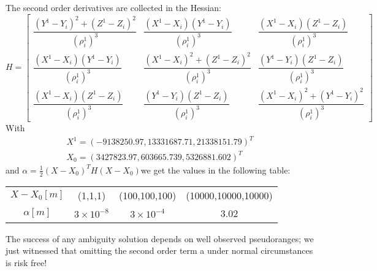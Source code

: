 		The second order derivatives are collected in the Hessian:
		\begin{equation}\label{eq:9.31}
			H=
			\begin{bmatrix}
				\dfrac{(Y^1-Y_i)^2+(Z^1-Z_i)^2}{(\rho^1_i)^3} & \dfrac{(X^1-X_i)(Y^1-Y_i)}{(\rho^1_i)^3} 		& \dfrac{(X^1-X_i)(Z^1-Z_i)}{(\rho^1_i)^3} \\
				\dfrac{(X^1-X_i)(Y^1-Y_i)}{(\rho^1_i)^3}       & \dfrac{(X^1-X_i)^2+(Z^1-Z_i)^2}{(\rho^1_i)^3}   & \dfrac{(Y^1-Y_i)(Z^1-Z_i)}{(\rho^1_i)^3} \\
				\dfrac{(X^1-X_i)(Z^1-Z_i)}{(\rho^1_i)^3} 	  & \dfrac{(Y^1-Y_i)(Z^1-Z_i)}{(\rho^1_i)^3} 		& \dfrac{(X^1-X_i)^2+(Y^1-Y_i)^2}{(\rho^1_i)^3}		
			\end{bmatrix}
		\end{equation}
		With
		\[
		\begin{split}
		X^1=(-9138250.97,13331687.71,21338151.79)^T \\
		X_0=(3427823.97,603665.739,5326881.602)^T
		\end{split}
		\]
		and $\alpha=\frac{1}{2}(X-X_0)^TH(X-X_0)$we get the values in the following table:
		\begin{table}
			\begin{tabular}{cccc}
				\hline
				$X-X_0[m]$ & (1,1,1) & (100,100,100) & (10000,10000,10000) \\ 
				$\alpha [m]$ & $3\times10^{-8}$ & $3\times10^{-4}$ & 3.02 \\ 
				\hline
			\end{tabular} 
		\end{table}
		The success of any ambiguity solution depends on well observed pseudoranges; we just witnessed that omitting the second order term a under normal circumstances is risk free!
			
